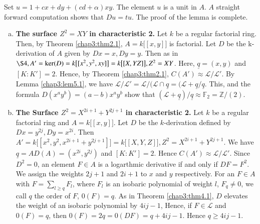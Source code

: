     \noindent
    Set $u = 1 + cx + dy + (cd + \alpha ) xy$. The element $u$ is a
    unit in $A$. $A$ straight forward computation shows that $Du =
    tu$. The proof of the lemma is complete. 
\begin{enumerate}[(a)]
\item \textbf{The surface {\boldmath$Z^2 = XY$} in characteristic
  2.} Let $k$  
  be a regular factorial ring. Then, by Theorem \ref{chap3:thm2.1}, $A
  = k \big [ [x, 
      y ]\big]$ is factorial. Let $D$ be the k-derivation of $A$ given
  by $Dx = x, Dy = y$. Then as in  $\S 4, A' = \ker (D) = k \big
  [[x^2, y^2, xy ]\big] = k \big [ [ X, Y Z]\big], Z^2 = XY$. Here,
  $\underline{q} = (x, y)$ and $[K : K'] = 2$. Hence, by Theorem
  \ref{chap3:thm2.1},
  $C(A') \approx \mathscr{L}/ \mathscr{L}'$. By Lemma
  \ref{chap3:lem5.1}, we have 
  $\mathscr{L}/ \mathscr{L}' = \mathscr{L}\big / (\mathscr{L} \cap
  \underline{q}= (\mathscr{L} + \underline{q}\big /
  \underline{q}$. This, and the formula $D (x^a y^b) = (a-b) x^a y^b$
  show that $(\mathscr{L} + \underline{q}) / \underline{q} \approx
  \mathbb{F}_2 = \mathbb{Z}/ (2)$. 

\item \textbf{The Surface {\boldmath$Z^2 = X^{2 i +1}+ Y^{2 j + 1}$} in
    characteristic 2.}\pageoriginale 
   Let $k$ be a regular factorial ring and $A = k \big [[x, y
      ]\big]$. Let $D$ be the $k$-derivation defined by $Dx = y^{2j}, Dy
    = x^{2i}$. Then $A' = k \big [[x^2, y^2, x^{2i + 1}+ y^{2j +1}]
      \big] = k \big [[X, Y, Z]\big], Z^2 = X^{2i +1} + Y^{2j +1}$. We
    have $\underline{q} = A D(A) = (x^{2i}, y^{2j})$ and $[K : K'] =
    2$. Hence $C(A') \approx \mathscr{L}/ \mathscr{L}'$. Since $D^2=
    0$, an element $F \in A$ is a logarthmic derivative if and only if
    $DF = F^2$. We assign the weights $2j +1$ and $2 i +1$ to $x$ and
    $y$ respectively. For an $F \in A$ with $F = \sum\limits_{l \ge q}
    F_l$, where $F_l$ is an  isobaric polynomial of weight $l$, $F_q
    \neq 0$, we call $q$ the order of $F$, $0(F) = q$. As in Theorem
    \ref{chap3:thm4.1}, $D$ elevates the weight of an isobaric
    polynomial by $4 ij - 
    1$, Hence, if $F \in \mathscr{L}$ and $0(F) = q$, then $0(F)=2q =
    0(DF) = q + 4 ij - 1$. Hence $q \ge 4ij - 1$. 
    \end{enumerate}

